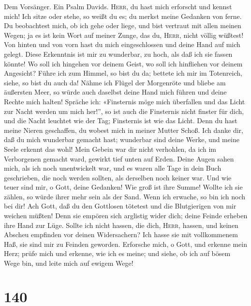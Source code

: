  Dem Vorsänger. Ein Psalm Davids. \textsc{Herr}, du hast
mich erforscht und kennst mich!  Ich sitze oder stehe, so
weißt du es; du merkst meine Gedanken von ferne.  Du
beobachtest mich, ob ich gehe oder liege, und bist vertraut mit allen
meinen Wegen;  ja es ist kein Wort auf meiner Zunge, das
du, \textsc{Herr}, nicht völlig wüßtest!  Von hinten und
von vorn hast du mich eingeschlossen und deine Hand auf mich gelegt.
 Diese Erkenntnis ist mir zu wunderbar, zu hoch, als daß
ich sie fassen könnte!  Wo soll ich hingehen vor deinem
Geist, wo soll ich hinfliehen vor deinem Angesicht?  Führe
ich zum Himmel, so bist du da; bettete ich mir im Totenreich, siehe, so
bist du auch da!  Nähme ich Flügel der Morgenröte und
bliebe am äußersten Meer,  so würde auch daselbst deine
Hand mich führen und deine Rechte mich halten!  Spräche
ich: «Finsternis möge mich überfallen und das Licht zur Nacht werden um
mich her!'',  so ist auch die Finsternis nicht finster
für dich, und die Nacht leuchtet wie der Tag; Finsternis ist wie das
Licht.  Denn du hast meine Nieren geschaffen, du wobest
mich in meiner Mutter Schoß.  Ich danke dir, daß du mich
wunderbar gemacht hast; wunderbar sind deine Werke, und meine Seele
erkennt das wohl!  Mein Gebein war dir nicht verhohlen,
da ich im Verborgenen gemacht ward, gewirkt tief unten auf Erden.
 Deine Augen sahen mich, als ich noch unentwickelt war,
und es waren alle Tage in dein Buch geschrieben, die noch werden
sollten, als derselben noch keiner war.  Und wie teuer
sind mir, o Gott, deine Gedanken! Wie groß ist ihre Summe!
 Wollte ich sie zählen, so würde ihrer mehr sein als der
Sand. Wenn ich erwache, so bin ich noch bei dir!  Ach
Gott, daß du den Gottlosen tötetest und die Blutgierigen von mir weichen
müßten!  Denn sie empören sich arglistig wider dich;
deine Feinde erheben ihre Hand zur Lüge.  Sollte ich
nicht hassen, die dich, \textsc{Herr}, hassen, und keinen Abscheu
empfinden vor deinen Widersachern?  Ich hasse sie mit
vollkommenem Haß, sie sind mir zu Feinden geworden. 
Erforsche mich, o Gott, und erkenne mein Herz; prüfe mich und erkenne,
wie ich es meine;  und siehe, ob ich auf bösem Wege bin,
und leite mich auf ewigem Wege!

\hypertarget{section-139}{%
\section{140}\label{section-139}}

